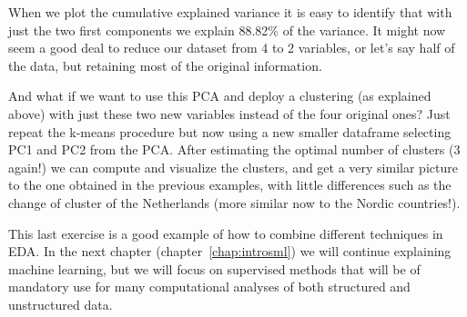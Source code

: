 
When we plot the cumulative explained variance it is easy to identify that with just the two first components we explain 88.82\% of the variance. It might now seem a good deal to reduce our dataset from 4 to 2 variables, or let’s say half of the data, but retaining most of the original information.


And what if we want to use this PCA and deploy a clustering (as explained above) with just these two new variables instead of the four original ones?  Just repeat the k-means procedure but now using a new smaller dataframe selecting PC1 and PC2 from the PCA. After estimating the optimal number of clusters (3 again!) we can compute and visualize the clusters, and get a very similar picture to the one obtained in the previous examples, with little differences such as the change of cluster of the Netherlands (more similar now to the Nordic countries!). 


This last exercise is a good example of how to combine different techniques in EDA. In the next chapter (chapter~\ref{chap:introsml}) we will continue explaining machine learning, but we will focus on supervised methods that will be of mandatory use for many computational analyses of both structured and unstructured data.
